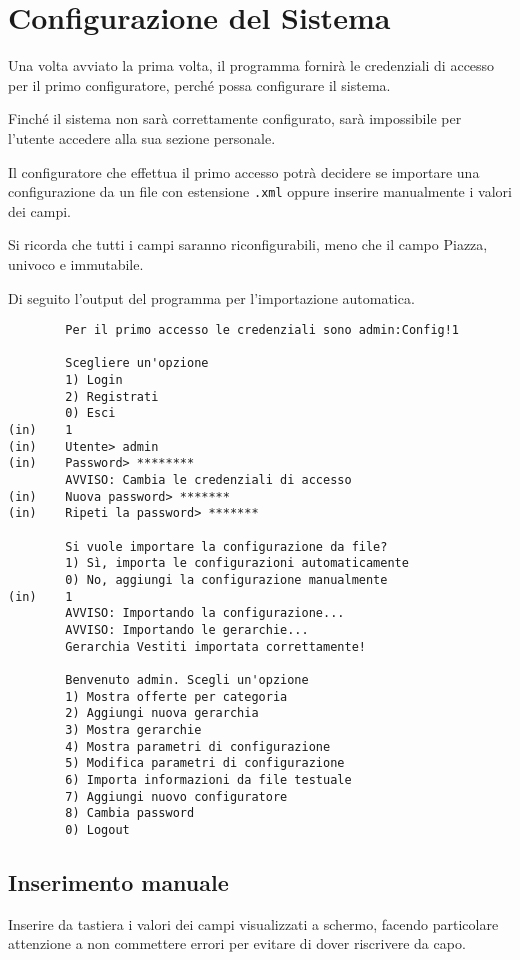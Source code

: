 
\section{Configurazione del Sistema}
Una volta avviato la prima volta, il programma fornirà le credenziali di accesso per il primo configuratore, perché possa configurare il sistema.

Finché il sistema non sarà correttamente configurato, sarà impossibile per l'utente accedere alla sua sezione personale.

Il configuratore che effettua il primo accesso potrà decidere se importare una configurazione da un file con estensione \verb|.xml| oppure inserire manualmente i valori dei campi.

Si ricorda che tutti i campi saranno riconfigurabili, meno che il campo Piazza, univoco e immutabile.

Di seguito l'output del programma per l'importazione automatica.
\begin{lstlisting}
        Per il primo accesso le credenziali sono admin:Config!1

        Scegliere un'opzione
        1) Login
        2) Registrati
        0) Esci
(in)    1
(in)    Utente> admin
(in)    Password> ********
        AVVISO: Cambia le credenziali di accesso
(in)    Nuova password> *******
(in)    Ripeti la password> *******
        
        Si vuole importare la configurazione da file?
        1) Sì, importa le configurazioni automaticamente
        0) No, aggiungi la configurazione manualmente
(in)    1
        AVVISO: Importando la configurazione...
        AVVISO: Importando le gerarchie...
        Gerarchia Vestiti importata correttamente!
        
        Benvenuto admin. Scegli un'opzione
        1) Mostra offerte per categoria
        2) Aggiungi nuova gerarchia
        3) Mostra gerarchie
        4) Mostra parametri di configurazione
        5) Modifica parametri di configurazione
        6) Importa informazioni da file testuale
        7) Aggiungi nuovo configuratore
        8) Cambia password
        0) Logout
\end{lstlisting}

\subsection{Inserimento manuale}

Inserire da tastiera i valori dei campi visualizzati a schermo, facendo particolare attenzione a non commettere errori per evitare di dover riscrivere da capo.

